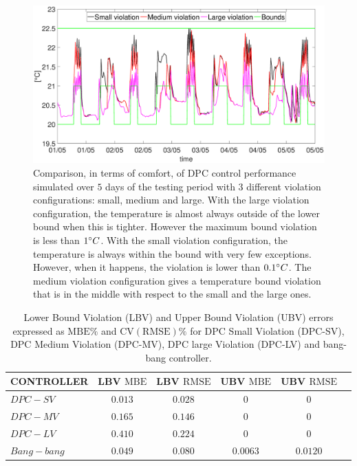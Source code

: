\begin{figure}[t!]
	\begin{center}
		\includegraphics[width=28pc]{figures/Temperatures_all.eps}
	\end{center}
	\caption{Comparison, in terms of comfort, of DPC control performance simulated over $5$ days of the testing period with $3$ different violation configurations: small, medium and large. With the large violation configuration, the temperature is almost always outside of the lower bound when this is tighter. However the maximum bound violation is less than $1\degree C$. With the small violation configuration, the temperature is always within the bound with very few exceptions. However, when it happens, the violation is lower than $0.1\degree C$. The medium violation configuration gives a temperature bound violation that is in the middle with respect to the small and the large ones.}
	\label{F:comparison_all_temperature}
\end{figure}
\begin{table}[t!]
	\centering
	\begin{tabular}{lccccc}
		\toprule
		CONTROLLER  & LBV $\mathrm{MBE}$  & LBV $\mathrm{RMSE}$ & UBV $\mathrm{MBE}$ & UBV $\mathrm{RMSE}$ 	\\ 
		\midrule
		$DPC-SV$    & $0.013$             & $0.028$  			      & $0$    				 & $0$     	  	\\
		$DPC-MV$    & $0.165$ 			  & $0.146$     			  & $0$    				 & $0$		  	\\
		$DPC-LV$    & $0.410$  			  & $0.224$     			  & $0$    				 & $0$	      	\\
		$Bang-bang$ & $0.049$ 			  & $0.080$    				  & $0.0063$ 		     & $0.0120$	  	\\
		\bottomrule
	\end{tabular}
	\caption{Lower Bound Violation (LBV) and Upper Bound Violation (UBV) errors expressed as $\mathrm{MBE}\%$ and $\mathrm{CV(RMSE)}\%$ for DPC Small Violation (DPC-SV), DPC Medium Violation (DPC-MV), DPC large Violation (DPC-LV) and bang-bang controller.}
	\captionsetup{justification=centering}
	\label{T:violationErrors}
\end{table}

